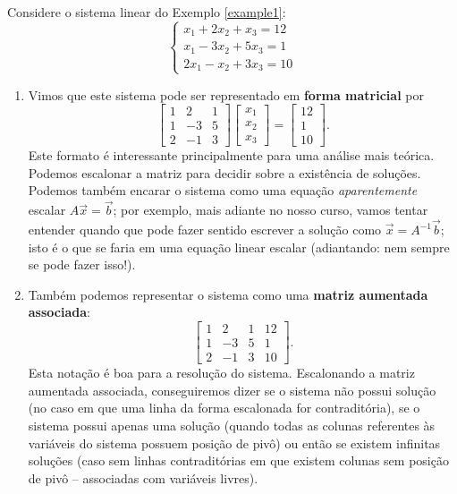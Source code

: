 \begin{ex}
Considere o sistema linear do Exemplo \ref{example1}:
\begin{equation}
\left\{
\begin{array}{ll}
x_1 + 2x_2 + x_3 = 12 \\
x_1 -3x_2 + 5x_3 = 1 \\
2x_1 - x_2 + 3x_3 = 10
\end{array}
\right.
\end{equation}
\begin{enumerate}[$(i)$]
\item Vimos que este sistema pode ser representado em \textbf{forma matricial} por
\begin{equation}
\left[
\begin{array}{ccc}
1 &  2 & 1  \\
1 & -3 & 5  \\
2 & -1 & 3
\end{array}
\right]
\left[
\begin{array}{c}
x_1   \\
x_2  \\
x_3
\end{array}
\right] =
\left[
\begin{array}{c}
12   \\
1  \\
10
\end{array}
\right].
\end{equation} Este formato é interessante principalmente para uma análise mais teórica. Podemos escalonar a matriz para decidir sobre a existência de soluções. Podemos também encarar o sistema como uma equação \textit{aparentemente} escalar $A \vec{x} = \vec{b}$; por exemplo, mais adiante no nosso curso, vamos tentar entender quando que pode fazer sentido escrever a solução como $\vec{x} = A^{-1} \vec{b}$; isto é o que se faria em uma equação linear escalar (adiantando: nem sempre se pode fazer isso!).
\item Também podemos representar o sistema como uma \textbf{matriz aumentada associada}:
\begin{equation}
\left[
\begin{array}{ccc|c}
1 &  2 & 1 & 12 \\
1 & -3 & 5 &  1 \\
2 & -1 & 3 & 10
\end{array}
\right].
\end{equation} Esta notação é boa para a resolução do sistema. Escalonando a matriz aumentada associada, conseguiremos dizer se o sistema não possui solução (no caso em que uma linha da forma escalonada for contraditória), se o sistema possui apenas uma solução (quando todas as colunas referentes às variáveis do sistema possuem posição de pivô) ou então se existem infinitas soluções (caso sem linhas contraditórias em que existem colunas sem posição de pivô -- associadas com variáveis livres).

\end{enumerate}
\end{ex}
